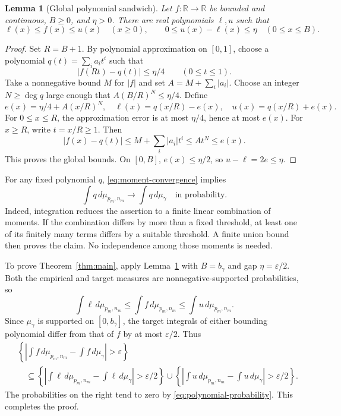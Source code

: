 \documentclass[11pt]{article}
\newtheorem{lemma}[theorem]{Lemma}
\theoremstyle{remark}
\newcommand{\R}{\mathbb R}
\begin{document}
\begin{lemma}[Global polynomial sandwich]\label{lem:sandwich}
Let $f:\R\to\R$ be bounded and continuous, $B\geq0$, and $\eta>0$. There are real polynomials $\ell,u$ such that
\[
 \ell(x)\leq f(x)\leq u(x)\quad(x\geq0),\qquad
 0\leq u(x)-\ell(x)\leq\eta\quad(0\leq x\leq B).
\]
\end{lemma}
\begin{proof}
Set $R=B+1$. By polynomial approximation on $[0,1]$, choose a polynomial $q(t)=\sum_i a_it^i$ such that
\[
 |f(Rt)-q(t)|\leq\eta/4\qquad(0\leq t\leq1).
\]
Take a nonnegative bound $M$ for $|f|$ and set $A=M+\sum_i|a_i|$. Choose an integer $N\geq\deg q$ large enough that $A(B/R)^N\leq\eta/4$. Define
\[
 e(x)=\eta/4+A(x/R)^N,\quad
 \ell(x)=q(x/R)-e(x),\quad u(x)=q(x/R)+e(x).
\]
For $0\leq x\leq R$, the approximation error is at most $\eta/4$, hence at most $e(x)$. For $x\geq R$, write $t=x/R\geq1$. Then
\[
 |f(x)-q(t)|\leq M+\sum_i|a_i|t^i\leq A t^N\leq e(x).
\]
This proves the global bounds. On $[0,B]$, $e(x)\leq\eta/2$, so $u-\ell=2e\leq\eta$.
\end{proof}

For any fixed polynomial $q$, \eqref{eq:moment-convergence} implies
\begin{equation}\label{eq:polynomial-probability}
 \int q\,d\mu_{p_m,n_m}\longrightarrow\int q\,d\mu_\gamma
 \quad\text{in probability}.
\end{equation}
Indeed, integration reduces the assertion to a finite linear combination of moments. If the combination differs by more than a fixed threshold, at least one of its finitely many terms differs by a suitable threshold. A finite union bound then proves the claim. No independence among those moments is needed.

To prove Theorem~\ref{thm:main}, apply Lemma~\ref{lem:sandwich} with $B=b_\gamma$ and gap $\eta=\varepsilon/2$. Both the empirical and target measures are nonnegative-supported probabilities, so
\[
 \int\ell\,d\mu_{p_m,n_m}\leq\int f\,d\mu_{p_m,n_m}
 \leq\int u\,d\mu_{p_m,n_m}.
\]
Since $\mu_\gamma$ is supported on $[0,b_\gamma]$, the target integrals of either bounding polynomial differ from that of $f$ by at most $\varepsilon/2$. Thus
\begin{align*}
 &\left\{\left|\int f\,d\mu_{p_m,n_m}-\int f\,d\mu_\gamma\right|>\varepsilon\right\}\\
 &\quad\subseteq
 \left\{\left|\int\ell\,d\mu_{p_m,n_m}-\int\ell\,d\mu_\gamma\right|>\varepsilon/2\right\}
 \cup
 \left\{\left|\int u\,d\mu_{p_m,n_m}-\int u\,d\mu_\gamma\right|>\varepsilon/2\right\}.
\end{align*}
The probabilities on the right tend to zero by \eqref{eq:polynomial-probability}. This completes the proof.
\end{document}
